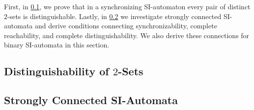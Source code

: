 
First, in \cref{sec:SI:dist}, we prove
that in a synchronizing SI-automaton every pair of distinct $2$-sets is distinguishable.
Lastly, in \cref{sec:SI:SCC} we investigate strongly connected SI-automata 
and derive conditions connecting synchronizability, complete reachability,
and complete distinguishability. We also derive these connections for binary SI-automata in this section.

\subsection{Distinguishability of $2$-Sets}
\label{sec:SI:dist} 



\subsection{Strongly Connected SI-Automata}
\label{sec:SI:SCC}


